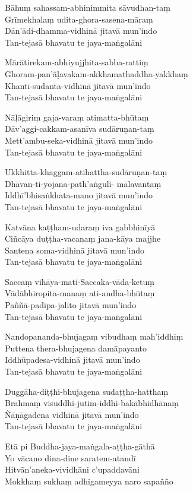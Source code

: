 \begin{paritta}
Bāhuṃ sahassam-abhinimmita sāvudhan-taṃ\\
Grīmekhalaṃ udita-ghora-sasena-māraṃ\\
Dān'ādi-dhamma-vidhinā jitavā mun'indo\\
Tan-tejasā bhavatu te jaya-maṅgalāni

Mārātirekam-abhiyujjhita-sabba-rattiṃ\\
Ghoram-pan'âḷavakam-akkhamathaddha-yakkhaṃ\\
Khantī-sudanta-vidhinā jitavā mun'indo\\
Tan-tejasā bhavatu te jaya-maṅgalāni

Nāḷāgiriṃ gaja-varaṃ atimatta-bhūtaṃ\\
Dāv'aggi-cakkam-asanīva sudāruṇan-taṃ\\
Mett'ambu-seka-vidhinā jitavā mun'indo\\
Tan-tejasā bhavatu te jaya-maṅgalāni

Ukkhitta-khaggam-atihattha-sudāruṇan-taṃ\\
Dhāvan-ti-yojana-path'aṅguli- mālavantaṃ\\
Iddhī'bhisaṅkhata-mano jitavā mun'indo\\
Tan-tejasā bhavatu te jaya-maṅgalāni

Katvāna kaṭṭham-udaraṃ iva gabbhinīyā\\
Ciñcāya duṭṭha-vacanaṃ jana-kāya majjhe\\
Santena soma-vidhinā jitavā mun'indo\\
Tan-tejasā bhavatu te jaya-maṅgalāni

Saccaṃ vihāya-mati-Saccaka-vāda-ketuṃ\\
Vādābhiropita-manaṃ ati-andha-bhūtaṃ\\
Paññā-padīpa-jalito jitavā mun'indo\\
Tan-tejasā bhavatu te jaya-maṅgalāni

Nandopananda-bhujagaṃ vibudhaṃ mah'iddhiṃ\\
Puttena thera-bhujagena damāpayanto\\
Iddhūpadesa-vidhinā jitavā mun'indo\\
Tan-tejasā bhavatu te jaya-maṅgalāni

Duggāha-diṭṭhi-bhujagena sudaṭṭha-hatthaṃ\\
Brahmaṃ visuddhi-jutim-iddhi-bakābhidhānaṃ\\
Ñāṇāgadena vidhinā jitavā mun'indo\\
Tan-tejasā bhavatu te jaya-maṅgalāni

Etā pi Buddha-jaya-maṅgala-aṭṭha-gāthā\\
Yo vācano dina-dine saratem-atandī\\
Hitvān'aneka-vividhāni c'upaddavāni\\
Mokkhaṃ sukhaṃ adhigameyya naro sapañño
\end{paritta}


